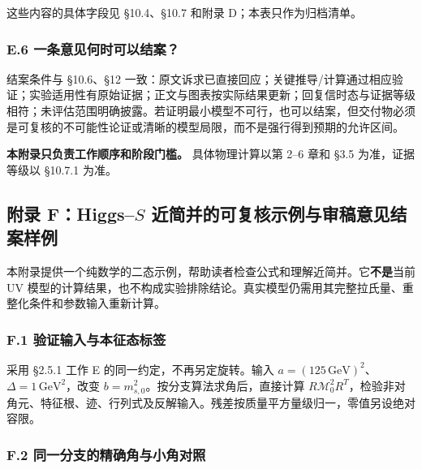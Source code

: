 \documentclass[
  chinese,
  UTF8]{ctexart}
\begin{document}
这些内容的具体字段见 §10.4、§10.7 和附录 D；本表只作为归档清单。

\subsubsection{E.6
一条意见何时可以结案？}\label{e.6-ux4e00ux6761ux610fux89c1ux4f55ux65f6ux53efux4ee5ux7ed3ux6848}

结案条件与 §10.6、§12
一致：原文诉求已直接回应；关键推导/计算通过相应验证；实验适用性有原始证据；正文与图表按实际结果更新；回复信时态与证据等级相符；未评估范围明确披露。若证明最小模型不可行，也可以结案，但交付物必须是可复核的不可能性论证或清晰的模型局限，而不是强行得到预期的允许区间。

\textbf{本附录只负责工作顺序和阶段门槛。} 具体物理计算以第 2--6 章和
§3.5 为准，证据等级以 §10.7.1 为准。

\subsection{\texorpdfstring{附录 F：Higgs--\(S\)
近简并的可复核示例与审稿意见结案样例}{附录 F：Higgs--S 近简并的可复核示例与审稿意见结案样例}}\label{ux9644ux5f55-fhiggss-ux8fd1ux7b80ux5e76ux7684ux53efux590dux6838ux793aux4f8bux4e0eux5ba1ux7a3fux610fux89c1ux7ed3ux6848ux6837ux4f8b}

本附录提供一个纯数学的二态示例，帮助读者检查公式和理解近简并。它\textbf{不是}当前
UV
模型的计算结果，也不构成实验排除结论。真实模型仍需用其完整拉氏量、重整化条件和参数输入重新计算。

\subsubsection{F.1
验证输入与本征态标签}\label{f.1-ux9a8cux8bc1ux8f93ux5165ux4e0eux672cux5f81ux6001ux6807ux7b7e}

采用 §2.5.1 工作 E 的同一约定，不再另定旋转。输入
\(a=(125\,\mathrm{GeV})^2\)、\(\Delta=1\,\mathrm{GeV}^2\)，改变
\(b=m_{s,0}^2\)。按分支算法求角后，直接计算
\(R\mathcal M_0^2R^T\)，检验非对角元、特征根、迹、行列式及反解输入。残差按质量平方量级归一，零值另设绝对容限。

\subsubsection{F.2
同一分支的精确角与小角对照}\label{f.2-ux540cux4e00ux5206ux652fux7684ux7cbeux786eux89d2ux4e0eux5c0fux89d2ux5bf9ux7167}
\end{document}
